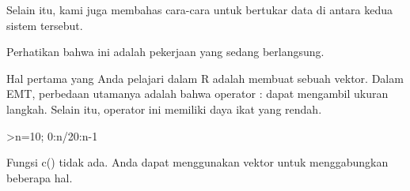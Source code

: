 \documentclass[a4paper,10pt]{article}
\begin{document}
\begin{eulernotebook}
\begin{eulercomment}
\begin{eulercomment}
\begin{eulercomment}
\begin{eulercomment}
\begin{eulercomment}
\begin{eulercomment}
\begin{eulercomment}
\begin{eulercomment}
\begin{eulercomment}
\begin{eulercomment}
\begin{eulercomment}
\begin{eulercomment}
\begin{eulercomment}
\begin{eulercomment}
\begin{eulercomment}
\begin{eulercomment}
\begin{eulercomment}
\begin{eulercomment}
\begin{eulercomment}
\begin{eulercomment}
\begin{eulercomment}
\begin{eulercomment}
\begin{eulercomment}
Selain itu, kami juga membahas cara-cara untuk bertukar data di antara
kedua sistem tersebut.
\end{eulercomment}
\begin{eulercomment}
Perhatikan bahwa ini adalah pekerjaan yang sedang berlangsung.
\end{eulercomment}
\begin{eulercomment}
Hal pertama yang Anda pelajari dalam R adalah membuat sebuah vektor.
Dalam EMT, perbedaan utamanya adalah bahwa operator : dapat mengambil
ukuran langkah. Selain itu, operator ini memiliki daya ikat yang
rendah.
\end{eulercomment}
\begin{eulerprompt}
>n=10; 0:n/20:n-1
\end{eulerprompt}
\begin{euleroutput}
  [0,  0.5,  1,  1.5,  2,  2.5,  3,  3.5,  4,  4.5,  5,  5.5,  6,  6.5,
  7,  7.5,  8,  8.5,  9]
\end{euleroutput}
\begin{eulercomment}
Fungsi c() tidak ada. Anda dapat menggunakan vektor untuk
menggabungkan beberapa hal.


\end{eulercomment}
\end{eulercomment}
\end{eulercomment}
\end{eulercomment}
\end{eulercomment}
\end{eulercomment}
\end{eulercomment}
\end{eulercomment}
\end{eulercomment}
\end{eulercomment}
\end{eulercomment}
\end{eulercomment}
\end{eulercomment}
\end{eulercomment}
\end{eulercomment}
\end{eulercomment}
\end{eulercomment}
\end{eulercomment}
\end{eulercomment}
\end{eulercomment}
\end{eulercomment}
\end{eulercomment}
\end{eulercomment}
\end{eulernotebook}
\end{document}
